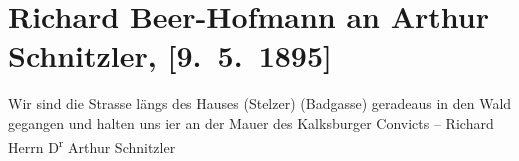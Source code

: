 

         
         \renewcommand{\erwaehntePersonen}{Personen: Friedrich Carl Andreas, Lou Andreas-Salomé, Josef Haidenthaller}
         \renewcommand{\erwaehnteOrte}{Orte: Badgasse, Berlin, Gasthaus Stelzer, Johannesgasse, Kollegium Kalksburg, Wien}
         \renewcommand{\erwaehnteWerke}{}
               \section[Richard Beer-Hofmann an Arthur Schnitzler, {[}9. 5. 1895{]}]{ Richard Beer-Hofmann an Arthur Schnitzler, {[}9. 5. 1895{]}}\nopagebreak{}\rehead{ }\begin{ledgroupsized}[t]{13cm}\normalsize\beginnumbering \toendnotes[C]{\smallbreak\pagebreak[2]} 
\toendnotes[C]{\smallbreak}\pstart
           \noindent{}{\pb}Wir sind die Strasse längs des
               Hauses (Stelzer) (Badgasse) geradeaus in den Wald gegangen und halten uns i{\geminationm}er an der Mauer des Kalksburger Convicts –\pend
           \pstart \spacefill\mbox{Richard}\pend{}\pstart
           \noindent{}Herrn D\textsuperscript{r} Arthur Schnitzler\pend
           
         
         \endnumbering{}\end{ledgroupsized}  \newcommand{\dateiname}{L00439}\newcommand{\titel}{Richard Beer-Hofmann an Arthur Schnitzler, [9. 5. 1895]}\newcommand{\editorInnen}{Martin Anton Müller und Gerd-Hermann Susen}
      